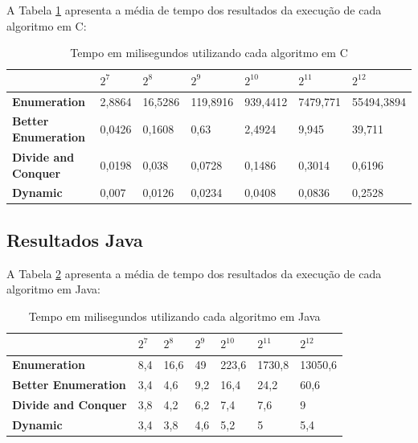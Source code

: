 \documentclass[
	12pt,				%
	oneside,   	        %
	a4paper,			%
	english,			%
	french,				%
	spanish,			%
	brazil,				%
	]{pacotes/abntex2}
\begin{document}
A Tabela \ref{tab:c} apresenta a média de tempo dos resultados da execução de cada algoritmo em C:

\begin{table}[!htb]
\centering
\caption{Tempo em milisegundos utilizando cada algoritmo em C}
\label{tab:c}
\footnotesize   %
\begin{tabular}{l|llllll}
\toprule
\textbf{} & $2^7$ & $2^8$ & $2^9$ & $2^{10}$ & $2^{11}$ & $2^{12}$\\
\midrule
\textbf{Enumeration} & 2,8864 & 16,5286 & 119,8916 & 939,4412 & 7479,771 & 55494,3894\\
\textbf{Better Enumeration} & 0,0426 & 0,1608 & 0,63 & 2,4924 & 9,945 & 39,711\\
\textbf{Divide and Conquer} &0,0198 & 0,038 & 0,0728 & 0,1486 & 0,3014 & 0,6196\\
\textbf{Dynamic} & 0,007 & 0,0126 & 0,0234 & 0,0408 & 0,0836 & 0,2528\\
\bottomrule
\end{tabular}
\end{table}


\subsection{Resultados Java}

A Tabela \ref{tab:java} apresenta a média de tempo dos resultados da execução de cada algoritmo em Java:

\begin{table}[!htb]
\centering
\caption{Tempo em milisegundos utilizando cada algoritmo em Java}
\label{tab:java}
\footnotesize   %
\begin{tabular}{l|llllll}
\toprule
\textbf{} & $2^7$ & $2^8$ & $2^9$ & $2^{10}$ & $2^{11}$ & $2^{12}$\\
\midrule
\textbf{Enumeration} & 8,4 & 16,6 & 49 & 223,6 & 1730,8 & 13050,6\\
\textbf{Better Enumeration} & 3,4 & 4,6 & 9,2 & 16,4 & 24,2 & 60,6\\
\textbf{Divide and Conquer} & 3,8 & 4,2 & 6,2 & 7,4 & 7,6 & 9\\
\textbf{Dynamic} & 3,4 & 3,8 & 4,6 & 5,2 & 5 &5,4\\
\bottomrule
\end{tabular}
\end{table}
\end{document}
